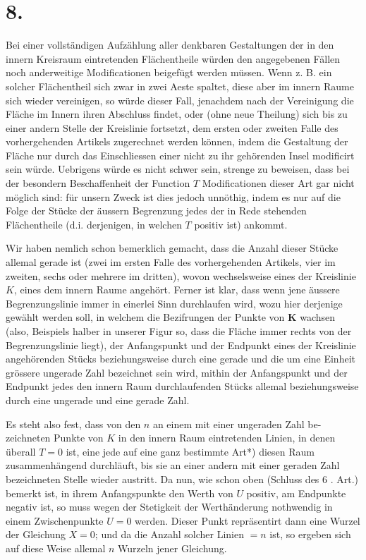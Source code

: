 \documentclass[10pt]{article}
\begin{document}
\section*{8.}
Bei einer vollständigen Aufzählung aller denkbaren Gestaltungen der in den innern Kreisraum eintretenden Flächentheile würden den angegebenen Fällen noch anderweitige Modificationen beigefügt werden müssen. Wenn z. B. ein solcher Flächentheil sich zwar in zwei Aeste spaltet, diese aber im innern Raume sich wieder vereinigen, so würde dieser Fall, jenachdem nach der Vereinigung die Fläche im Innern ihren Abschluss findet, oder (ohne neue Theilung) sich bis zu einer andern Stelle der Kreislinie fortsetzt, dem ersten oder zweiten Falle des vorhergehenden Artikels zugerechnet werden können, indem die Gestaltung der Fläche nur durch das Einschliessen einer nicht zu ihr gehörenden Insel modificirt sein würde. Uebrigens würde es nicht schwer sein, strenge zu beweisen, dass bei der besondern Beschaffenheit der Function \(T\) Modificationen dieser Art gar nicht möglich sind: für unsern Zweck ist dies jedoch unnöthig, indem es nur auf die Folge der Stücke der äussern Begrenzung jedes der in Rede stehenden Flächentheile (d.i. derjenigen, in welchen \(T\) positiv ist) ankommt.

Wir haben nemlich schon bemerklich gemacht, dass die Anzahl dieser Stücke allemal gerade ist (zwei im ersten Falle des vorhergehenden Artikels, vier im zweiten, sechs oder mehrere im dritten), wovon wechselsweise eines der Kreislinie \(K\), eines dem innern Raume angehört. Ferner ist klar, dass wenn jene äussere Begrenzungslinie immer in einerlei Sinn durchlaufen wird, wozu hier derjenige gewählt werden soll, in welchem die Bezifrungen der Punkte von \(\boldsymbol{K}\) wachsen (also, Beispiels halber in unserer Figur so, dass die Fläche immer rechts von der Begrenzungslinie liegt), der Anfangspunkt und der Endpunkt eines der Kreislinie angehörenden Stücks beziehungsweise durch eine gerade und die um eine Einheit grössere ungerade Zahl bezeichnet sein wird, mithin der Anfangspunkt und der Endpunkt jedes den innern Raum durchlaufenden Stücks allemal beziehungsweise durch eine ungerade und eine gerade Zahl.

Es steht also fest, dass von den \(n\) an einem mit einer ungeraden Zahl be-
zeichneten Punkte von \(K\) in den innern Raum eintretenden Linien, in denen überall \(T=0\) ist, eine jede auf eine ganz bestimmte Art*) diesen Raum zusammenhängend durchläuft, bis sie an einer andern mit einer geraden Zahl bezeichneten Stelle wieder austritt. Da nun, wie schon oben (Schluss des 6 . Art.) bemerkt ist, in ihrem Anfangspunkte den Werth von \(U\) positiv, am Endpunkte negativ ist, so muss wegen der Stetigkeit der Werthänderung nothwendig in einem Zwischenpunkte \(U=0\) werden. Dieser Punkt repräsentirt dann eine Wurzel der Gleichung \(X=0\); und da die Anzahl solcher Linien \(=n\) ist, so ergeben sich auf diese Weise allemal \(n\) Wurzeln jener Gleichung.
\end{document}
